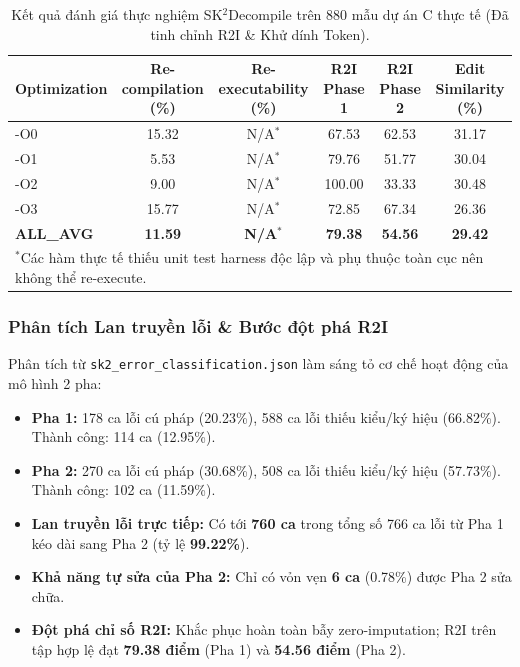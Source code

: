 \documentclass[11pt,a4paper]{article}
\begin{document}
\begin{table}[h]
\centering
\caption{Kết quả đánh giá thực nghiệm SK$^2$Decompile trên 880 mẫu dự án C thực tế (Đã tinh chỉnh R2I \& Khử dính Token).}
\label{tab:real_c_results}
\begin{tabular}{lccccc}
\toprule
\textbf{Optimization} & \textbf{Re-compilation (\%)} & \textbf{Re-executability (\%)} & \textbf{R2I Phase 1} & \textbf{R2I Phase 2} & \textbf{Edit Similarity (\%)} \\
\midrule
-O0      & 15.32 & N/A$^*$ & 67.53 & 62.53 & 31.17 \\
-O1      & 5.53  & N/A$^*$ & 79.76 & 51.77 & 30.04 \\
-O2      & 9.00  & N/A$^*$ & 100.00 & 33.33 & 30.48 \\
-O3      & 15.77 & N/A$^*$ & 72.85 & 67.34 & 26.36 \\
\midrule
\textbf{ALL\_AVG} & \textbf{11.59} & \textbf{N/A$^*$} & \textbf{79.38} & \textbf{54.56} & \textbf{29.42} \\
\bottomrule
\multicolumn{6}{l}{\footnotesize $^*$Các hàm thực tế thiếu unit test harness độc lập và phụ thuộc toàn cục nên không thể re-execute.}
\end{tabular}
\end{table}

\subsubsection{Phân tích Lan truyền lỗi \& Bước đột phá R2I}
Phân tích từ \texttt{sk2\_error\_classification.json} làm sáng tỏ cơ chế hoạt động của mô hình 2 pha:
\begin{itemize}
    \item \textbf{Pha 1:} 178 ca lỗi cú pháp (20.23\%), 588 ca lỗi thiếu kiểu/ký hiệu (66.82\%). Thành công: 114 ca (12.95\%).
    \item \textbf{Pha 2:} 270 ca lỗi cú pháp (30.68\%), 508 ca lỗi thiếu kiểu/ký hiệu (57.73\%). Thành công: 102 ca (11.59\%).
    \item \textbf{Lan truyền lỗi trực tiếp:} Có tới \textbf{760 ca} trong tổng số 766 ca lỗi từ Pha 1 kéo dài sang Pha 2 (tỷ lệ \textbf{99.22\%}).
    \item \textbf{Khả năng tự sửa của Pha 2:} Chỉ có vỏn vẹn \textbf{6 ca} (0.78\%) được Pha 2 sửa chữa.
    \item \textbf{Đột phá chỉ số R2I:} Khắc phục hoàn toàn bẫy zero-imputation; R2I trên tập hợp lệ đạt \textbf{79.38 điểm} (Pha 1) và \textbf{54.56 điểm} (Pha 2).
\end{itemize}
\end{document}
